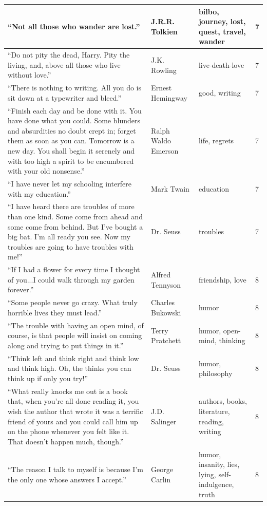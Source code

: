 \documentclass[
  letterpaper,
  DIV=11,
  numbers=noendperiod]{scrreprt}
\begin{document}
\begin{tabular}[t]{l|l|l|l}
\hline
“Not all those who wander are lost.” & J.R.R. Tolkien & bilbo, journey, lost, quest, travel, wander & 7\\
\hline
“Do not pity the dead, Harry. Pity the living, and, above all those who live without love.” & J.K. Rowling & live-death-love & 7\\
\hline
“There is nothing to writing. All you do is sit down at a typewriter and bleed.” & Ernest Hemingway & good, writing & 7\\
\hline
“Finish each day and be done with it. You have done what you could. Some blunders and absurdities no doubt crept in; forget them as soon as you can. Tomorrow is a new day. You shall begin it serenely and with too high a spirit to be encumbered with your old nonsense.” & Ralph Waldo Emerson & life, regrets & 7\\
\hline
“I have never let my schooling interfere with my education.” & Mark Twain & education & 7\\
\hline
“I have heard there are troubles of more than one kind. Some come from ahead and some come from behind. But I've bought a big bat. I'm all ready you see. Now my troubles are going to have troubles with me!” & Dr. Seuss & troubles & 7\\
\hline
“If I had a flower for every time I thought of you...I could walk through my garden forever.” & Alfred Tennyson & friendship, love & 8\\
\hline
“Some people never go crazy. What truly horrible lives they must lead.” & Charles Bukowski & humor & 8\\
\hline
“The trouble with having an open mind, of course, is that people will insist on coming along and trying to put things in it.” & Terry Pratchett & humor, open-mind, thinking & 8\\
\hline
“Think left and think right and think low and think high. Oh, the thinks you can think up if only you try!” & Dr. Seuss & humor, philosophy & 8\\
\hline
“What really knocks me out is a book that, when you're all done reading it, you wish the author that wrote it was a terrific friend of yours and you could call him up on the phone whenever you felt like it. That doesn't happen much, though.” & J.D. Salinger & authors, books, literature, reading, writing & 8\\
\hline
“The reason I talk to myself is because I’m the only one whose answers I accept.” & George Carlin & humor, insanity, lies, lying, self-indulgence, truth & 8\\

\end{tabular}
\end{document}

